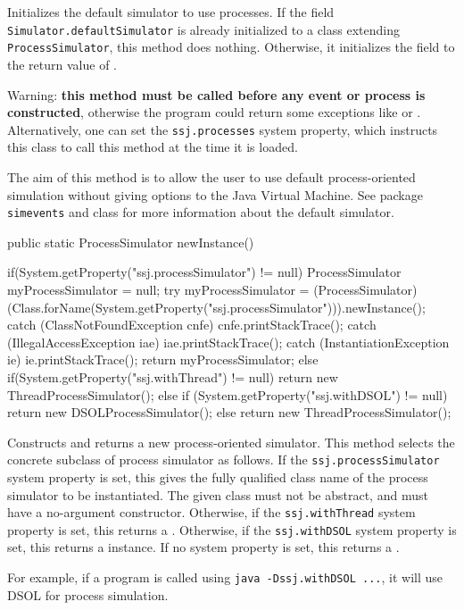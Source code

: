   \begin{tabb}  Initializes the default simulator to use processes.
    If the field \texttt{Simulator.defaultSimulator} is already initialized to a class
    extending \texttt{ProcessSimulator}, this
    method does nothing.
    Otherwise, it initializes the field to the return value of
    .

   Warning: \textbf{this method must be called before any event or process is
   constructed},  otherwise the program could return some exceptions like
    or .
   Alternatively, one can set the \texttt{ssj.processes} system property, which
   instructs this class to call this method at the time it is loaded.

   The aim of this method is to allow the user to use default process-oriented
   simulation without giving options to the Java Virtual Machine.
   See package
   \texttt{simevents} and class  for more information about the default simulator.
  \end{tabb}
\begin{code}

   public static ProcessSimulator newInstance()\begin{hide} {
      if(System.getProperty("ssj.processSimulator") != null) {
         ProcessSimulator myProcessSimulator = null;
         try{
            myProcessSimulator = (ProcessSimulator)(Class.forName(System.getProperty("ssj.processSimulator"))).newInstance();
         }
         catch (ClassNotFoundException cnfe) { cnfe.printStackTrace(); }
         catch (IllegalAccessException iae)  { iae.printStackTrace(); }
         catch (InstantiationException ie)   { ie.printStackTrace(); }
         return myProcessSimulator;
      }
      else if(System.getProperty("ssj.withThread") != null)
         return new ThreadProcessSimulator();
      else if (System.getProperty("ssj.withDSOL") != null)
         return new DSOLProcessSimulator();
      else
         return new ThreadProcessSimulator();
   }\end{hide}
\end{code}
\begin{tabb}  Constructs and returns a new process-oriented simulator.
  This method selects the concrete subclass of process simulator as follows.
  If the \texttt{ssj.processSimulator} system property is set, this gives the
  fully qualified class name of the process simulator to be instantiated.
  The given class must not be abstract, and must have a no-argument constructor.
  Otherwise, if the \texttt{ssj.withThread} system property is set, this returns a
  .
  Otherwise, if the \texttt{ssj.withDSOL} system property is set, this
  returns a  instance.
  If no system property is set, this returns a .

  For example, if a program is called using \texttt{java -Dssj.withDSOL ...}, it will use DSOL
  for process simulation.
\end{tabb}
\begin{code}\begin{hide}
}
\end{hide}\end{code}
